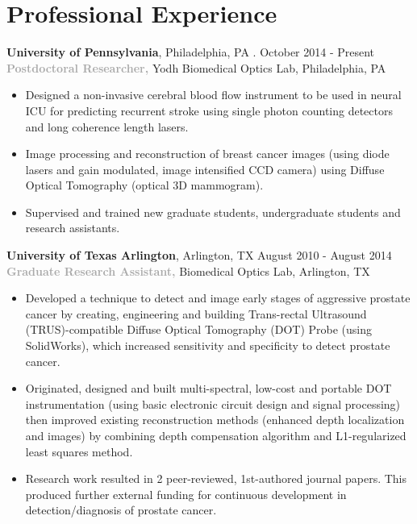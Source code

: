 \documentclass{my_cv}
\begin{document}
\vspace{-7mm}%


\section{Professional Experience}
\begin{flushleft}  

\textbf{University of Pennsylvania}, Philadelphia, PA . \hfill October 2014 - Present \\ 
\textbf{\textcolor{darkgray}{Postdoctoral Researcher,} }Yodh Biomedical Optics Lab, Philadelphia, PA
\vspace{-2.5mm}
\begin{itemize} \itemsep -2pt %
\item Designed a non-invasive cerebral blood flow instrument to be used in neural ICU for predicting recurrent stroke using single photon counting detectors and long coherence length lasers. 
\item Image processing and reconstruction of breast cancer images (using diode lasers and gain modulated, image intensified CCD camera) using Diffuse Optical Tomography (optical 3D mammogram).
\item Supervised and trained new graduate students, undergraduate students and research assistants.  
\end{itemize}

\textbf{University of Texas Arlington}, Arlington, TX \hfill August 2010 - August 2014 \\
\textbf{\textcolor{darkgray}{Graduate Research Assistant,} }Biomedical Optics Lab, Arlington, TX 
\begin{itemize} \itemsep -2pt %
\vspace{-2.5mm}
\item Developed a technique to detect and image early stages of aggressive prostate cancer by creating, engineering and building Trans-rectal Ultrasound (TRUS)-compatible Diffuse Optical Tomography (DOT) Probe (using SolidWorks), which increased sensitivity and specificity to detect prostate cancer. 

\item Originated, designed and built multi-spectral, low-cost and portable DOT instrumentation (using basic electronic circuit design and signal processing) then improved existing reconstruction methods (enhanced depth localization and images) by combining depth compensation algorithm and L1-regularized least squares method.

\item Research work resulted in 2 peer-reviewed, 1st-authored journal papers. This produced further external funding for continuous development in detection/diagnosis of prostate cancer.

\end{itemize}
\end{flushleft}
 
\end{document}
